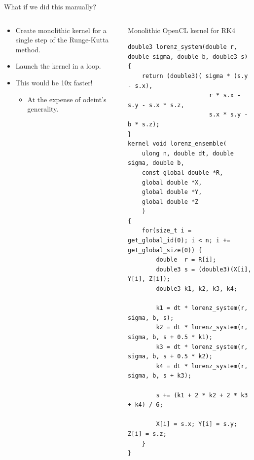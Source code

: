 \documentclass[@BEAMER_OPTIONS@]{beamer}
\begin{document}
\begin{frame}[fragile]{What if we did this manually?}
    \begin{columns}
        \begin{column}{0.5\textwidth}
            \begin{itemize}
                \item Create monolithic kernel for a single step of the
                    Runge-Kutta method.
                \item Launch the kernel in a loop.
                    \vspace{\baselineskip}
                \item This would be 10x faster!
                    \begin{itemize}
                        \item \alert{At the expense of odeint's generality.}
                    \end{itemize}
            \end{itemize}
        \end{column} \quad \quad
        \hspace{-3em}
        \begin{column}{0.45\textwidth}
            \begin{exampleblock}{Monolithic OpenCL kernel for RK4}
                \begin{adjustbox}{width=\textwidth,height=\textheight,keepaspectratio}
                    \begin{lstlisting}
double3 lorenz_system(double r, double sigma, double b, double3 s) {
    return (double3)( sigma * (s.y - s.x),
                       r * s.x - s.y - s.x * s.z,
                       s.x * s.y - b * s.z);
}
kernel void lorenz_ensemble(
    ulong n, double dt, double sigma, double b,
    const global double *R,
    global double *X,
    global double *Y,
    global double *Z
    )
{
    for(size_t i = get_global_id(0); i < n; i += get_global_size(0)) {
        double  r = R[i];
        double3 s = (double3)(X[i], Y[i], Z[i]);
        double3 k1, k2, k3, k4;

        k1 = dt * lorenz_system(r, sigma, b, s);
        k2 = dt * lorenz_system(r, sigma, b, s + 0.5 * k1);
        k3 = dt * lorenz_system(r, sigma, b, s + 0.5 * k2);
        k4 = dt * lorenz_system(r, sigma, b, s + k3);

        s += (k1 + 2 * k2 + 2 * k3 + k4) / 6;

        X[i] = s.x; Y[i] = s.y; Z[i] = s.z;
    }
}
                    \end{lstlisting}
                \end{adjustbox}
            \end{exampleblock}
        \end{column}
    \end{columns}
\end{frame}
\end{document}
